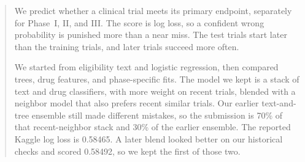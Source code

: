 \begin{abstract}
We predict whether a clinical trial meets its primary endpoint, separately
for Phase~I, II, and III. The score is log loss, so a confident wrong
probability is punished more than a near miss. The test trials start later
than the training trials, and later trials succeed more often.

We started from eligibility text and logistic regression, then compared
trees, drug features, and phase-specific fits. The model we kept is a stack
of text and drug classifiers, with more weight on recent trials, blended with
a neighbor model that also prefers recent similar trials. Our earlier
text-and-tree ensemble still made different mistakes, so the submission is
70\% of that recent-neighbor stack and 30\% of the earlier ensemble. The
reported Kaggle log loss is 0.58465. A later blend looked better on our
historical checks and scored 0.58492, so we kept the first of those two.
\end{abstract}
